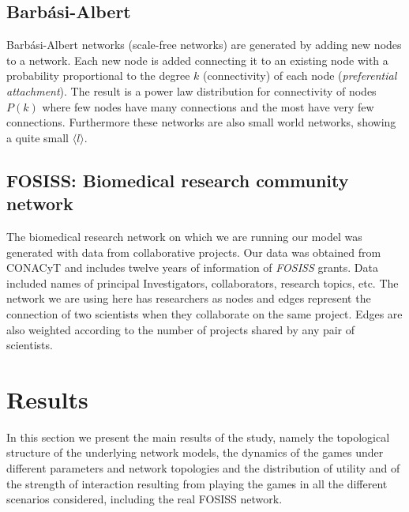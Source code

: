 \documentclass{bmcart}
\begin{document}
\subsection*{Barb\'asi-Albert}

Barb\'asi-Albert networks \cite{BarabasiAlbert:99} (scale-free
networks) are generated by adding new nodes to a network. Each new
node is added connecting it to an existing node with a probability
proportional to the degree $k$ (connectivity) of each node
(\textit{preferential attachment}). The result is a power law
distribution for connectivity of nodes $P(k)$ where few nodes have
many connections and the most have very few connections. Furthermore
these networks are also small world networks, showing a quite small
$\langle l \rangle$.


\subsection*{FOSISS: Biomedical research community network}

The biomedical research network on which we are running our model was
generated with data from collaborative projects. Our data was obtained
from CONACyT and includes twelve years of information of
\textit{FOSISS} grants. Data included names of principal
Investigators, collaborators, research topics, etc. The network we are
using here has researchers as nodes and edges represent the connection
of two scientists when they collaborate on the same project. Edges are
also weighted according to the number of projects shared by any pair
of scientists.

\section*{Results}

In this section we present the main results of the study, namely the
topological structure of the underlying network models, the dynamics
of the games under different parameters and network topologies and the
distribution of utility and of the strength of interaction resulting
from playing the games in all the different scenarios considered,
including the real FOSISS network.\\
\end{document}
